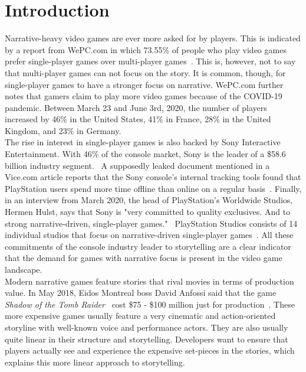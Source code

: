 \chapter{Introduction}
Narrative-heavy video games are ever more asked for by players. This is indicated by a report from WePC.com in which 73.55\% of people who play video games prefer single-player games over multi-player games~\cite{WePC2021}. This is, however, not to say that multi-player games can not focus on the story. It is common, though, for single-player games to have a stronger focus on narrative. WePC.com further notes that gamers claim to play more video games because of the COVID-19 pandemic. Between March 23 and June 3rd, 2020, the number of players increased by 46\% in the United States, 41\% in France, 28\% in the United Kingdom, and 23\% in Germany.~\cite{WePC2021}\\
The rise in interest in single-player games is also backed by Sony Interactive Entertainment. With 46\% of the console market, Sony is the leader of a \$58.6 billion industry segment.~\cite{Dealessandri2021} A supposedly leaked document mentioned in a Vice.com article reports that the Sony console's internal tracking tools found that PlayStation users spend more time offline than online on a regular basis~\cite{Klepek2020}. Finally, in an interview from March 2020, the head of PlayStation's Worldwide Studios, Hermen Hulst, says that Sony is "very committed to quality exclusives. And to strong narrative-driven, single-player games."~\cite{Shuman2021} PlayStation Studios consists of 14 individual studios that focus on narrative-driven single-player games~\cite{Sony2021}. All these commitments of the console industry leader to storytelling are a clear indicator that the demand for games with narrative focus is present in the video game landscape.\\
Modern narrative games feature stories that rival movies in terms of production value. In May 2018, Eidos Montreal boss David Anfossi said that the game \textit{Shadow of the Tomb Raider}~\cite{tombraider} cost \$75 - \$100 million just for production~\cite{Dring2018}. These more expensive games usually feature a very cinematic and action-oriented storyline with well-known voice and performance actors. They are also usually quite linear in their structure and storytelling. Developers want to ensure that players actually see and experience the expensive set-pieces in the stories, which explains this more linear approach to storytelling.\\
